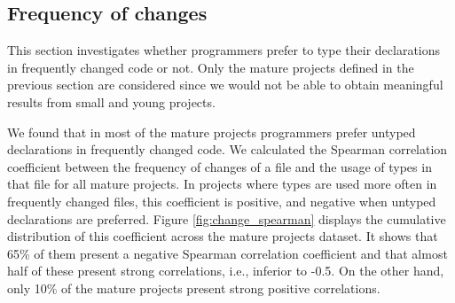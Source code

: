 \documentclass[]{sigplanconf}
\begin{document}


\subsection{Frequency of changes\label{sec:results-changes}}
This section investigates whether programmers prefer to type their declarations in frequently changed code or not.
Only the mature projects defined in the previous section are considered since we would not be able to obtain meaningful results from small and young projects.

We found that in most of the mature projects programmers prefer untyped declarations in frequently changed code.
We calculated the Spearman correlation coefficient between the frequency of changes of a file and the usage of types in that file for all mature projects.
In projects where types are used more often in frequently changed files, this coefficient is positive, and negative when untyped declarations are preferred.
Figure \ref{fig:change_spearman} displays the cumulative distribution of this coefficient across the mature projects dataset.
It shows that 65\% of them present a negative Spearman correlation coefficient and that almost half of these present strong correlations, i.e., inferior to -0.5.
On the other hand, only 10\% of the mature projects present strong positive correlations.
\end{document}
